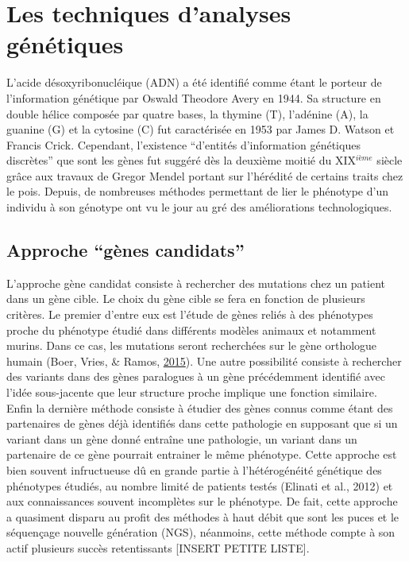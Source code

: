 \documentclass[12pt,twoside]{reedthesis}
\theoremstyle{definition}
\theoremstyle{definition}
\theoremstyle{remark}
\begin{document}
  \newpage  
  
  \section{Les techniques d'analyses
  génétiques}\label{les-techniques-danalyses-genetiques}
  
  L'acide désoxyribonucléique (ADN) a été identifié comme étant le porteur
  de l'information génétique par Oswald Theodore Avery en 1944. Sa
  structure en double hélice composée par quatre bases, la thymine (T),
  l'adénine (A), la guanine (G) et la cytosine (C) fut caractérisée en
  1953 par James D. Watson et Francis Crick. Cependant, l'existence
  ``d'entités d'information génétiques discrètes'' que sont les gènes fut
  suggéré dès la deuxième moitié du XIX\(^{ième}\) siècle grâce aux
  travaux de Gregor Mendel portant sur l'hérédité de certains traits chez
  le pois. Depuis, de nombreuses méthodes permettant de lier le phénotype
  d'un individu à son génotype ont vu le jour au gré des améliorations
  technologiques.
  
  \subsection{\texorpdfstring{Approche ``gènes
  candidats''}{Approche gènes candidats}}\label{approche-genes-candidats}
  
  L'approche gène candidat consiste à rechercher des mutations chez un
  patient dans un gène cible. Le choix du gène cible se fera en fonction
  de plusieurs critères. Le premier d'entre eux est l'étude de gènes
  reliés à des phénotypes proche du phénotype étudié dans différents
  modèles animaux et notamment murins. Dans ce cas, les mutations seront
  recherchées sur le gène orthologue humain (Boer, Vries, \& Ramos,
  \protect\hyperlink{ref-DeBoer2015}{2015}). Une autre possibilité
  consiste à rechercher des variants dans des gènes paralogues à un gène
  précédemment identifié avec l'idée sous-jacente que leur structure
  proche implique une fonction similaire. Enfin la dernière méthode
  consiste à étudier des gènes connus comme étant des partenaires de gènes
  déjà identifiés dans cette pathologie en supposant que si un variant
  dans un gène donné entraîne une pathologie, un variant dans un
  partenaire de ce gène pourrait entrainer le même phénotype. Cette
  approche est bien souvent infructueuse dû en grande partie à
  l'hétérogénéité génétique des phénotypes étudiés, au nombre limité de
  patients testés (Elinati et al., 2012) et aux connaissances souvent
  incomplètes sur le phénotype. De fait, cette approche a quasiment
  disparu au profit des méthodes à haut débit que sont les puces et le
  séquençage nouvelle génération (NGS), néanmoins, cette méthode compte à
  son actif plusieurs succès retentissants {[}INSERT PETITE LISTE{]}.
  
\end{document}

